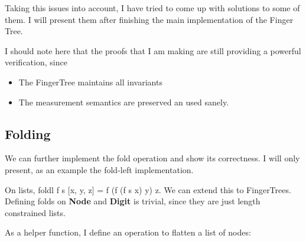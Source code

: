 \documentclass[12pt,twoside,notitlepage]{report}
\begin{document}
Taking this issues into account, I have tried to come up with solutions to some of them. I will present them after finishing the main implementation of the Finger Tree.

I should note here that the proofs that I am making are still providing a powerful verification, since
\begin{itemize}
\item The FingerTree maintains all invariants
\item The measurement semantics are preserved an used sanely.
\end{itemize}

\subsection{Folding}

We can further implement the fold operation and show its correctness. I will only present, as an example the fold-left implementation.

On lists, foldl f s [x, y, z] = f (f (f s x) y) z. We can extend this to FingerTrees. Defining folds on \textbf{Node} and \textbf{Digit} is trivial, since they are just length constrained lists.

As a helper function, I define an operation to flatten a list of nodes: 

\begin{code}
\\
\> \AgdaSymbol{:}  \AgdaSymbol{\{}\AgdaSymbol{\}\{} \AgdaSymbol{:}  \AgdaSymbol{\}\{} \AgdaSymbol{:}   \AgdaSymbol{\}}\<%
\\
\>[6]\<[14]%
\>[14]  \AgdaSymbol{:}   \<%
\\
\>[6]\<[14]%
\>[14]  \AgdaSymbol{:}    \<%
\\
\>[6]\<[14]%
\>[14]  \AgdaSymbol{(}  \AgdaSymbol{)}\<%
\\
\>[6]\<[14]%
\>[14]  \<%
\\
\> \AgdaInductiveConstructor{[]} \AgdaSymbol{=} \AgdaInductiveConstructor{[]}\<%
\\
\> \AgdaSymbol{(}  \AgdaSymbol{)} \AgdaSymbol{=} \AgdaSymbol{(} \AgdaSymbol{)} \AgdaFunction{++} \AgdaSymbol{(} \AgdaSymbol{)}\<%
\\
\end{code}
\end{document}
